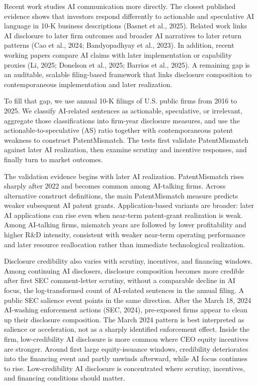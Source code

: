 Recent work studies AI communication more directly. The closest published evidence shows that investors respond differently to actionable and speculative AI language in 10-K business descriptions (Basnet et al., 2025). Related work links AI disclosure to later firm outcomes and broader AI narratives to later return patterns (Cao et al., 2024; Bandyopadhyay et al., 2023). In addition, recent working papers compare AI claims with later implementation or capability proxies (Li, 2025; Donelson et al., 2025; Barrios et al., 2025). A remaining gap is an auditable, scalable filing-based framework that links disclosure composition to contemporaneous implementation and later realization.

To fill that gap, we use annual 10-K filings of U.S. public firms from 2016 to 2025. We classify AI-related sentences as actionable, speculative, or irrelevant, aggregate those classifications into firm-year disclosure measures, and use the actionable-to-speculative (AS) ratio together with contemporaneous patent weakness to construct PatentMismatch. The tests first validate PatentMismatch against later AI realization, then examine scrutiny and incentive responses, and finally turn to market outcomes.

The validation evidence begins with later AI realization. PatentMismatch rises sharply after 2022 and becomes common among AI-talking firms. Across alternative construct definitions, the main PatentMismatch measure predicts weaker subsequent AI patent grants. Application-based variants are broader: later AI applications can rise even when near-term patent-grant realization is weak. Among AI-talking firms, mismatch years are followed by lower profitability and higher R\&D intensity, consistent with weaker near-term operating performance and later resource reallocation rather than immediate technological realization.

Disclosure credibility also varies with scrutiny, incentives, and financing windows. Among continuing AI disclosers, disclosure composition becomes more credible after first SEC comment-letter scrutiny, without a comparable decline in AI focus, the log-transformed count of AI-related sentences in the annual filing. A public SEC salience event points in the same direction. After the March 18, 2024 AI-washing enforcement actions (SEC, 2024), pre-exposed firms appear to clean up their disclosure composition. The March 2024 pattern is best interpreted as salience or acceleration, not as a sharply identified enforcement effect. Inside the firm, low-credibility AI disclosure is more common where CEO equity incentives are stronger. Around first large equity-issuance windows, credibility deteriorates into the financing event and partly unwinds afterward, while AI focus continues to rise. Low-credibility AI disclosure is concentrated where scrutiny, incentives, and financing conditions should matter.

